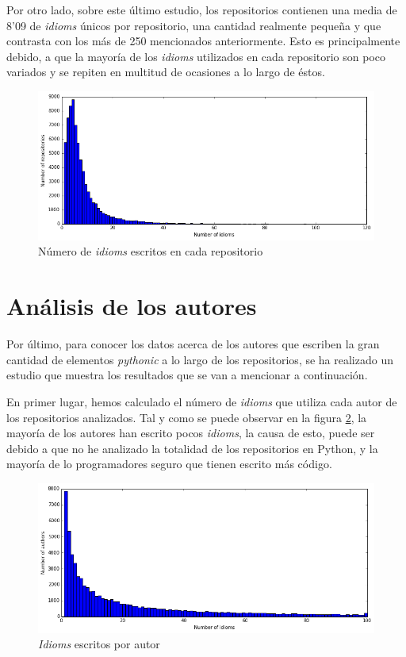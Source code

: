 \documentclass[a4paper, 12pt]{book}
\begin{document}
Por otro lado, sobre este último estudio, los repositorios contienen una media de 8'09 de \textit{idioms} únicos por repositorio, una cantidad realmente pequeña y que contrasta con los más de 250 mencionados anteriormente. Esto es principalmente debido, a que la mayoría de los \textit{idioms} utilizados en cada repositorio son poco variados y se repiten en multitud de ocasiones a lo largo de éstos.


\begin{figure}[t]
\centering
\includegraphics[width=140mm]{img/graphs/idioms_repos_abs.png}
\caption{Número de \textit{idioms} escritos en cada repositorio}
\label{fig:idioms_repos_abs}
\end{figure}




\section{Análisis de los autores}

Por último, para conocer los datos acerca de los autores que escriben la gran cantidad de elementos \textit{pythonic} a lo largo de los repositorios, se ha realizado un estudio que muestra los resultados que se van a mencionar a continuación.

En primer lugar, hemos calculado el número de \textit{idioms} que utiliza cada autor de los repositorios analizados. Tal y como se puede observar en la figura \ref{fig:idiom_per_author}, la mayoría de los autores han escrito pocos \textit{idioms}, la causa de esto, puede ser debido a que no he analizado la totalidad de los repositorios en Python, y la mayoría de lo programadores seguro que tienen escrito más código.

\begin{figure}[t]
\centering
\includegraphics[width=140mm]{img/graphs/idioms_per_author.png}
\caption{\textit{Idioms} escritos por autor}
\label{fig:idiom_per_author}
\end{figure}
\end{document}
